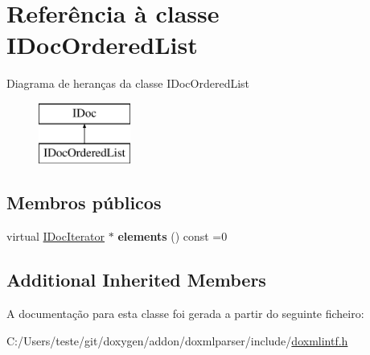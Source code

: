 \hypertarget{class_i_doc_ordered_list}{\section{Referência à classe I\-Doc\-Ordered\-List}
\label{class_i_doc_ordered_list}
}
Diagrama de heranças da classe I\-Doc\-Ordered\-List\begin{figure}[H]
\begin{center}
\leavevmode
\includegraphics[height=2.000000cm]{class_i_doc_ordered_list}
\end{center}
\end{figure}
\subsection*{Membros públicos}
\begin{DoxyCompactItemize}
\item 
\hypertarget{class_i_doc_ordered_list_ad6ead2baea7fba8812ab68d4125fc932}{virtual \hyperlink{class_i_doc_iterator}{I\-Doc\-Iterator} $\ast$ {\bfseries elements} () const =0}\label{class_i_doc_ordered_list_ad6ead2baea7fba8812ab68d4125fc932}

\end{DoxyCompactItemize}
\subsection*{Additional Inherited Members}


A documentação para esta classe foi gerada a partir do seguinte ficheiro\-:\begin{DoxyCompactItemize}
\item 
C\-:/\-Users/teste/git/doxygen/addon/doxmlparser/include/\hyperlink{include_2doxmlintf_8h}{doxmlintf.\-h}\end{DoxyCompactItemize}
